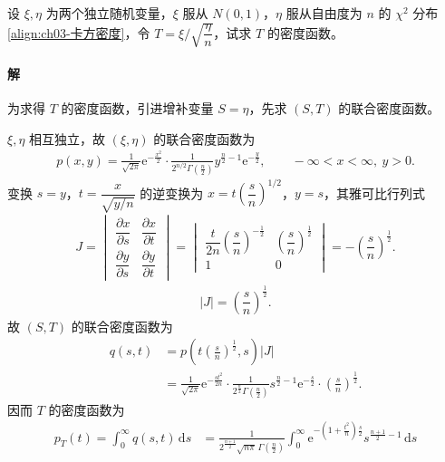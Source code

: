 \documentclass[../../main.tex]{subfiles}
\begin{document}
\begin{example}[$t$ 分布]\label{example:ch03-t分布}
设 $\xi,\eta$ 为两个独立随机变量，$\xi$ 服从 $N(0,1)$，$\eta$ 服从自由度为 $n$ 的 $\chi^{2}$ 分布\eqref{align:ch03-卡方密度}，令 $T=\xi\bigg/\sqrt{\dfrac{\eta}{n}}$，试求 $T$ 的密度函数。

\paragraph*{解}为求得 $T$ 的密度函数，引进增补变量 $S=\eta$，先求 $(S,T)$ 的联合密度函数。

$\xi,\eta$ 相互独立，故 $(\xi,\eta)$ 的联合密度函数为
\begin{align*}p(x,y)=\frac{1}{\sqrt{2\pi}}\mathrm{e}^{-\frac{x^{2}}{2}}\cdot\frac{1}{2^{n/2}\Gamma\!\left(\frac{n}{2}\right)}y^{\frac{n}{2}-1}\mathrm{e}^{-\frac{y}{2}},\qquad -\infty<x<\infty,\ y>0.\end{align*}
变换 $s=y$，$t=\dfrac{x}{\sqrt{y/n}}$ 的逆变换为 $x=t\left(\dfrac{s}{n}\right)^{1/2}$，$y=s$，其雅可比行列式
\begin{align*}J=\begin{vmatrix}
\dfrac{\partial x}{\partial s} & \dfrac{\partial x}{\partial t}\\[4pt]
\dfrac{\partial y}{\partial s} & \dfrac{\partial y}{\partial t}
\end{vmatrix}=\begin{vmatrix}
\dfrac{t}{2n}\left(\dfrac{s}{n}\right)^{-\frac{1}{2}} & \left(\dfrac{s}{n}\right)^{\frac{1}{2}}\\
1 & 0
\end{vmatrix}=-\left(\dfrac{s}{n}\right)^{\frac{1}{2}}.\end{align*}
\begin{align*}|J|=\left(\dfrac{s}{n}\right)^{\frac{1}{2}}.\end{align*}
故 $(S,T)$ 的联合密度函数为
\begin{align*}
q(s,t)&=p\left(t\left(\frac{s}{n}\right)^{\frac{1}{2}},s\right)|J|\\
&=\frac{1}{\sqrt{2\pi}}\mathrm{e}^{-\frac{s t^{2}}{2n}}\cdot\frac{1}{2^{\frac{n}{2}}\Gamma\!\left(\frac{n}{2}\right)}s^{\frac{n}{2}-1}\mathrm{e}^{-\frac{s}{2}}\cdot\left(\frac{s}{n}\right)^{\frac{1}{2}}.
\end{align*}
因而 $T$ 的密度函数为
\begin{align*}
p_T(t)=\int_{0}^{\infty}q(s,t)\,\mathrm{d}s
&=\frac{1}{2^{\frac{n+1}{2}}\sqrt{n\pi}\,\Gamma\!\left(\frac{n}{2}\right)}\int_{0}^{\infty}\mathrm{e}^{-\left(1+\frac{t^{2}}{n}\right)\frac{s}{2}}s^{\frac{n+1}{2}-1}\,\mathrm{d}s\\

\end{align*}
\end{example}
\end{document}
